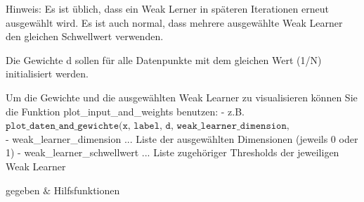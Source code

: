 \documentclass[11pt]{article}
\begin{document}
Hinweis: Es ist üblich, dass ein Weak Lerner in späteren Iterationen
erneut ausgewählt wird. Es ist auch normal, dass mehrere ausgewählte
Weak Learner den gleichen Schwellwert verwenden.

Die Gewichte d sollen für alle Datenpunkte mit dem gleichen Wert (1/N)
initialisiert werden.

Um die Gewichte und die ausgewählten Weak Learner zu visualisieren
können Sie die Funktion plot\_input\_and\_weights benutzen: - z.B.
\(\texttt{plot_daten_and_gewichte(x, label, d, weak_learner_dimension, weak_learner_schwellwert)}\)
- weak\_learner\_dimension ... Liste der ausgewählten Dimensionen
(jeweils 0 oder 1) - weak\_learner\_schwellwert ... Liste zugehöriger
Thresholds der jeweiligen Weak Learner

gegeben \(\&\) Hilfsfunktionen
\end{document}
